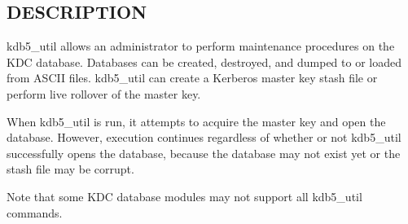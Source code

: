 \documentclass[letterpaper,10pt,english]{sphinxmanual}
\begin{document}
\subsection{DESCRIPTION}
\label{admin/admin_commands/kdb5_util:kdb5-util-synopsis-end}\label{admin/admin_commands/kdb5_util:description}
kdb5\_util allows an administrator to perform maintenance procedures on
the KDC database.  Databases can be created, destroyed, and dumped to
or loaded from ASCII files.  kdb5\_util can create a Kerberos master
key stash file or perform live rollover of the master key.

When kdb5\_util is run, it attempts to acquire the master key and open
the database.  However, execution continues regardless of whether or
not kdb5\_util successfully opens the database, because the database
may not exist yet or the stash file may be corrupt.

Note that some KDC database modules may not support all kdb5\_util
commands.
\end{document}
